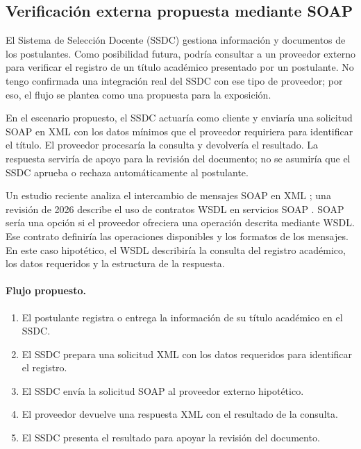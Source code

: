 \subsection{Verificación externa propuesta mediante SOAP}

El Sistema de Selección Docente (SSDC) gestiona información y documentos de
los postulantes. Como posibilidad futura, podría consultar a un proveedor
externo para verificar el registro de un título académico presentado por un
postulante. No tengo confirmada una integración real del SSDC con ese tipo de
proveedor; por eso, el flujo se plantea como una propuesta para la exposición.

En el escenario propuesto, el SSDC actuaría como cliente y enviaría una
solicitud SOAP en XML con los datos mínimos que el proveedor requiriera para
identificar el título. El proveedor procesaría la consulta y devolvería el
resultado. La respuesta serviría de apoyo para la revisión del documento; no
se asumiría que el SSDC aprueba o rechaza automáticamente al postulante.

Un estudio reciente analiza el intercambio de mensajes SOAP en XML
\cite{ayfan2024soap}; una revisión de 2026 describe el uso de contratos WSDL
en servicios SOAP \cite{kannan-soap-rest-2026}. SOAP sería una opción si
el proveedor ofreciera una operación descrita mediante WSDL. Ese contrato definiría las operaciones disponibles y los
formatos de los mensajes. En este caso hipotético, el WSDL describiría la
consulta del registro académico, los datos requeridos y la estructura de la
respuesta.

\paragraph{Flujo propuesto.}
\begin{enumerate}
    \item El postulante registra o entrega la información de su título
          académico en el SSDC.
    \item El SSDC prepara una solicitud XML con los datos requeridos para
          identificar el registro.
    \item El SSDC envía la solicitud SOAP al proveedor externo hipotético.
    \item El proveedor devuelve una respuesta XML con el resultado de la
          consulta.
    \item El SSDC presenta el resultado para apoyar la revisión del documento.
\end{enumerate}

